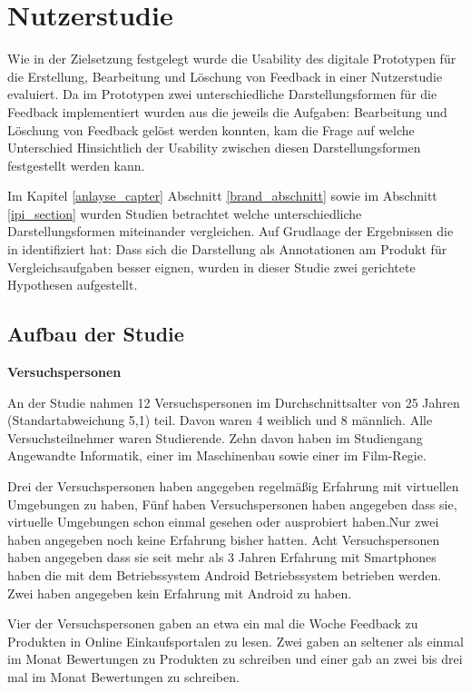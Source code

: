 \chapter{Nutzerstudie}\label{study}

Wie in der Zielsetzung festgelegt wurde die Usability des digitale Prototypen für die Erstellung, Bearbeitung und Löschung von Feedback 
in einer Nutzerstudie evaluiert. Da im Prototypen zwei unterschiedliche Darstellungsformen für die Feedback implementiert wurden aus die jeweils die Aufgaben: Bearbeitung 
und Löschung von Feedback gelöst werden konnten, kam die Frage auf welche Unterschied Hinsichtlich der Usability zwischen diesen Darstellungsformen festgestellt werden kann. 

Im Kapitel \ref{anlayse_capter} Abschnitt \ref{brand_abschnitt} sowie im Abschnitt \ref{ipi_section} wurden Studien betrachtet welche unterschiedliche Darstellungsformen 
miteinander vergleichen. Auf Grudlaage der Ergebnissen die \citeauthor{Brandenburg2019} in \cite{Brandenburg2019} identifiziert hat: Dass sich die Darstellung als Annotationen 
am Produkt für Vergleichsaufgaben besser eignen, wurden in dieser Studie zwei gerichtete Hypothesen aufgestellt. 
 
\section{Aufbau der Studie}

\textbf{Versuchspersonen}

An der Studie nahmen 12 Versuchspersonen im Durchschnittsalter von 25 Jahren (Standartabweichung 5,1) teil.  Davon waren 4 weiblich und 8 männlich. 
Alle Versuchsteilnehmer waren Studierende. Zehn davon haben im Studiengang Angewandte Informatik, einer im Maschinenbau sowie einer im Film-Regie. 

Drei der Versuchspersonen haben angegeben regelmäßig Erfahrung mit virtuellen Umgebungen zu haben, Fünf haben  Versuchspersonen haben angegeben dass sie, virtuelle Umgebungen schon 
einmal gesehen oder ausprobiert haben.Nur zwei haben angegeben noch keine Erfahrung bisher hatten. 
Acht Versuchspersonen haben angegeben dass sie seit mehr als 3 Jahren Erfahrung mit Smartphones haben die mit dem Betriebssystem Android Betriebssystem betrieben werden. Zwei haben angegeben kein 
Erfahrung mit Android zu haben. 

Vier der Versuchspersonen gaben an etwa ein mal die Woche Feedback zu Produkten in Online Einkaufsportalen zu lesen. Zwei gaben an seltener als einmal im Monat Bewertungen zu Produkten zu schreiben und einer gab
an zwei bis drei mal im Monat Bewertungen zu schreiben. 

